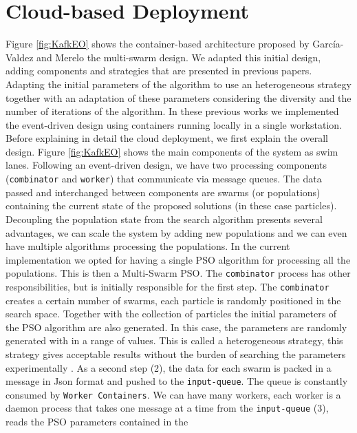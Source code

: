 \documentclass{cys}
\begin{document}
\section{Cloud-based Deployment}
\label{sec:aws-deployment}


Figure \ref{fig:KafkEO} shows the container-based architecture proposed by García-Valdez and
Merelo \cite{valdez2021container,garcia2018modern} the multi-swarm design. We adapted this initial
design, adding components and strategies that are presented in previous papers. Adapting the 
initial parameters of the algorithm to use an heterogeneous strategy \cite{mancilla2024pendiente} 
together with an adaptation of these parameters considering the diversity and the number of iterations of the algorithm. 
In these previous works we implemented the event-driven design using containers running 
locally in a single workstation. Before explaining in detail the cloud deployment, we first explain the overall design. 
Figure \ref{fig:KafkEO} shows the main components of the system as swim lanes. 
Following an event-driven design, we have two processing components (\texttt{combinator} and \texttt{worker}) that communicate via message queues.  
The data passed and interchanged between components are swarms (or populations) containing 
the current state of the proposed solutions (in these case particles). Decoupling the 
population state from the search algorithm presents several advantages, we can scale 
the system by adding new populations and we can even have multiple algorithms processing 
the populations. In the current implementation we opted for having a single PSO algorithm 
for processing all the populations. This is then a Multi-Swarm PSO.
The \texttt{combinator} process has other responsibilities, but is initially responsible 
for  
the first step. The \texttt{combinator} creates a certain number of swarms, each particle 
is randomly positioned in the search space. Together with the collection of particles the 
initial parameters of the PSO algorithm are also generated. In this case, the parameters 
are randomly generated with in a range of values. This is called a heterogeneous strategy, this strategy 
gives acceptable results without the burden of searching the 
parameters experimentally \cite{mancilla2023optimization}. As a second step (2), the data 
for each swarm is packed in a message in Json format and pushed to the \texttt{input-queue}. 
The queue is constantly consumed by \texttt{Worker Containers}. 
We can have many workers, each worker is a daemon process that takes one message at a 
time from the \texttt{input-queue} (3), reads the PSO parameters contained in the 
\end{document}
